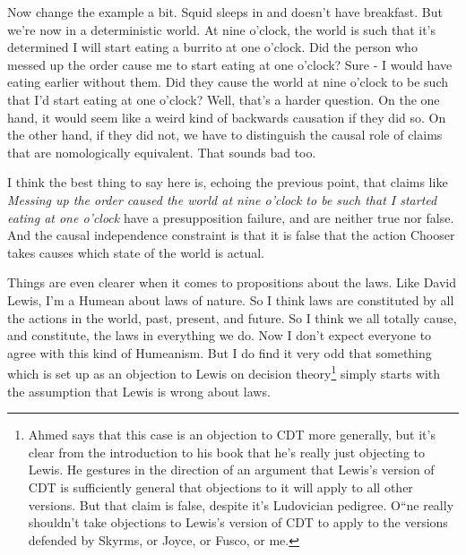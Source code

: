 \documentclass[
  12pt,
  letterpaper,
  DIV=11,
  numbers=noendperiod]{scrreprt}
\begin{document}
Now change the example a bit. Squid sleeps in and doesn't have
breakfast. But we're now in a deterministic world. At nine o'clock, the
world is such that it's determined I will start eating a burrito at one
o'clock. Did the person who messed up the order cause me to start eating
at one o'clock? Sure - I would have eating earlier without them. Did
they cause the world at nine o'clock to be such that I'd start eating at
one o'clock? Well, that's a harder question. On the one hand, it would
seem like a weird kind of backwards causation if they did so. On the
other hand, if they did not, we have to distinguish the causal role of
claims that are nomologically equivalent. That sounds bad too.

I think the best thing to say here is, echoing the previous point, that
claims like \emph{Messing up the order caused the world at nine o'clock
to be such that I started eating at one o'clock} have a presupposition
failure, and are neither true nor false. And the causal independence
constraint is that it is false that the action Chooser takes causes
which state of the world is actual.

Things are even clearer when it comes to propositions about the laws.
Like David Lewis, I'm a Humean about laws of nature. So I think laws are
constituted by all the actions in the world, past, present, and future.
So I think we all totally cause, and constitute, the laws in everything
we do. Now I don't expect everyone to agree with this kind of Humeanism.
But I do find it very odd that something which is set up as an objection
to Lewis on decision theory\footnote{Ahmed says that this case is an
  objection to CDT more generally, but it's clear from the introduction
  to his book that he's really just objecting to Lewis. He gestures in
  the direction of an argument that Lewis's version of CDT is
  sufficiently general that objections to it will apply to all other
  versions. But that claim is false, despite it's Ludovician pedigree.
  O``ne really shouldn't take objections to Lewis's version of CDT to
  apply to the versions defended by Skyrms, or Joyce, or Fusco, or me.}
simply starts with the assumption that Lewis is wrong about laws.
\end{document}
